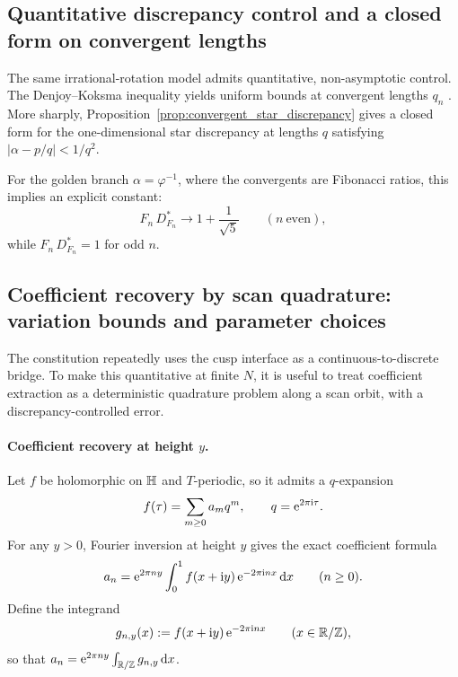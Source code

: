 \subsection{Quantitative discrepancy control and a closed form on convergent lengths}
\label{sec:quant_discrepancy}

The same irrational-rotation model admits quantitative, non-asymptotic control. The Denjoy--Koksma inequality yields uniform bounds at convergent lengths $q_n$ \cite{Denjoy1932,Koksma1935,KatokHasselblatt1995}. More sharply, Proposition~\ref{prop:convergent_star_discrepancy} gives a closed form for the one-dimensional star discrepancy at lengths $q$ satisfying $|\alpha-p/q|<1/q^2$.

For the golden branch $\alpha=\varphi^{-1}$, where the convergents are Fibonacci ratios, this implies an explicit constant:
\begin{equation}
F_n\,D_{F_n}^\ast \to 1+\frac{1}{\sqrt{5}}
\qquad (n\ \text{even}),
\end{equation}
while $F_n\,D_{F_n}^\ast=1$ for odd $n$.

\subsection{Coefficient recovery by scan quadrature: variation bounds and parameter choices}
\label{sec:coeff_recovery_bounds}

The constitution repeatedly uses the cusp interface as a continuous-to-discrete bridge. To make this quantitative at finite $N$, it is useful to treat coefficient extraction as a deterministic quadrature problem along a scan orbit, with a discrepancy-controlled error.

\paragraph{Coefficient recovery at height \texorpdfstring{$y$}{y}.}
Let $f$ be holomorphic on $\mathbb{H}$ and $T$-periodic, so it admits a $q$-expansion
\begin{equation}
f(\tau)=\sum_{m\ge 0} a_m q^m,\qquad q=\mathrm{e}^{2\pi\mathrm{i}\tau}.
\end{equation}
For any $y>0$, Fourier inversion at height $y$ gives the exact coefficient formula
\begin{equation}
a_n
=
\mathrm{e}^{2\pi n y}\int_0^1 f(x+\mathrm{i} y)\,\mathrm{e}^{-2\pi\mathrm{i} n x}\,\mathrm{d} x
\qquad (n\ge 0).
\label{eq:coeff_recovery_integral}
\end{equation}
Define the integrand
\begin{equation}
g_{n,y}(x):=f(x+\mathrm{i} y)\,\mathrm{e}^{-2\pi\mathrm{i} n x}\qquad (x\in\mathbb{R}/\mathbb{Z}),
\label{eq:def_gny}
\end{equation}
so that $a_n=\mathrm{e}^{2\pi n y}\int_{\mathbb{R}/\mathbb{Z}} g_{n,y}\,\mathrm{d} x$.

